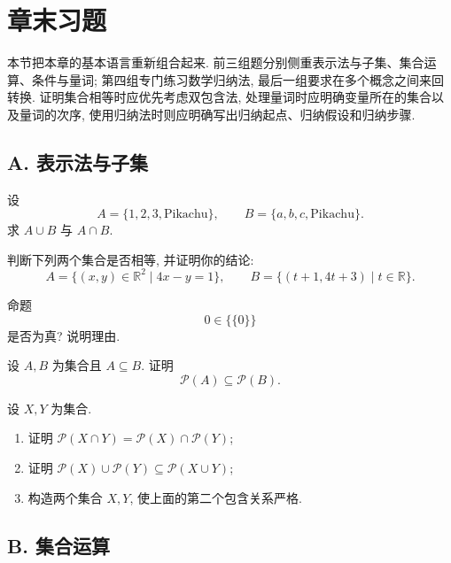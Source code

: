 \documentclass[usesamecnt, thmcnt=section, lang=cn, newtx, 10pt, scheme=chinese]{elegantbook}
\begin{document}
\section{章末习题}

本节把本章的基本语言重新组合起来. 前三组题分别侧重表示法与子集、集合运算、条件与量词; 第四组专门练习数学归纳法, 最后一组要求在多个概念之间来回转换. 证明集合相等时应优先考虑双包含法, 处理量词时应明确变量所在的集合以及量词的次序, 使用归纳法时则应明确写出归纳起点、归纳假设和归纳步骤.

\subsection*{A. 表示法与子集}

\begin{exercise}\label{ex:sets-01}
设
\[
 A=\{1,2,3,\text{Pikachu}\},
 \qquad
 B=\{a,b,c,\text{Pikachu}\}.
\]
求 $A\cup B$ 与 $A\cap B$.
\end{exercise}

\begin{exercise}\label{ex:sets-03}
判断下列两个集合是否相等, 并证明你的结论:
\[
 A=\{(x,y)\in\mathbb R^2\mid4x-y=1\},
 \qquad
 B=\{(t+1,4t+3)\mid t\in\mathbb R\}.
\]
\end{exercise}

\begin{exercise}\label{ex:sets-04}
命题
\[
 0\in\{\{0\}\}
\]
是否为真? 说明理由.
\end{exercise}

\begin{exercise}\label{ex:sets-05}
设 $A,B$ 为集合且 $A\subseteq B$. 证明
\[
 \mathscr P(A)\subseteq\mathscr P(B).
\]
\end{exercise}

\begin{exercise}\label{ex:sets-08}
设 $X,Y$ 为集合.
\begin{enumerate}[label=\rm(\arabic*)]
  \item 证明 $\mathscr P(X\cap Y)=\mathscr P(X)\cap\mathscr P(Y)$;
  \item 证明 $\mathscr P(X)\cup\mathscr P(Y)\subseteq\mathscr P(X\cup Y)$;
  \item 构造两个集合 $X,Y$, 使上面的第二个包含关系严格.
\end{enumerate}
\end{exercise}

\subsection*{B. 集合运算}
\end{document}
